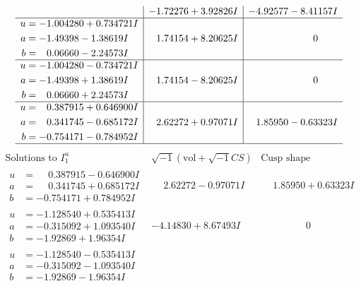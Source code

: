 \documentclass[1p]{elsarticle_modified}
\theoremstyle{definition}
\newcommand{\I}{\sqrt{-1}}
\begin{document}
$$\begin{array}{c|c|c}
 & -1.72276 + 3.92826 I & -4.92577 - 8.41157 I \\ \hline\begin{aligned}
u &= -1.004280 + 0.734721 I \\
a &= -1.49398 - 1.38619 I \\
b &= \phantom{-}0.06660 - 2.24573 I\end{aligned}
 & \phantom{-}1.74154 + 8.20625 I & \phantom{-0.000000 } 0 \\ \hline\begin{aligned}
u &= -1.004280 - 0.734721 I \\
a &= -1.49398 + 1.38619 I \\
b &= \phantom{-}0.06660 + 2.24573 I\end{aligned}
 & \phantom{-}1.74154 - 8.20625 I & \phantom{-0.000000 } 0 \\ \hline\begin{aligned}
u &= \phantom{-}0.387915 + 0.646900 I \\
a &= \phantom{-}0.341745 - 0.685172 I \\
b &= -0.754171 - 0.784952 I\end{aligned}
 & \phantom{-}2.62272 + 0.97071 I & \phantom{-}1.85950 - 0.63323 I\\
 \hline 
 \end{array}$$\newpage$$\begin{array}{c|c|c}  
\text{Solutions to }I^u_{1}& \I (\text{vol} + \sqrt{-1}CS) & \text{Cusp shape}\\
 \hline 
\begin{aligned}
u &= \phantom{-}0.387915 - 0.646900 I \\
a &= \phantom{-}0.341745 + 0.685172 I \\
b &= -0.754171 + 0.784952 I\end{aligned}
 & \phantom{-}2.62272 - 0.97071 I & \phantom{-}1.85950 + 0.63323 I \\ \hline\begin{aligned}
u &= -1.128540 + 0.535413 I \\
a &= -0.315092 + 1.093540 I \\
b &= -1.92869 + 1.96354 I\end{aligned}
 & -4.14830 + 8.67493 I & \phantom{-0.000000 } 0 \\ \hline\begin{aligned}
u &= -1.128540 - 0.535413 I \\
a &= -0.315092 - 1.093540 I \\
b &= -1.92869 - 1.96354 I\end{aligned}

\end{array}$$
\end{document}
